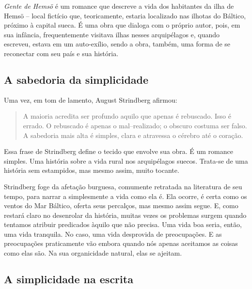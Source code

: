 \documentclass[12pt]{extarticle}
\begin{document}
\emph{Gente de Hemsö} é um romance que descreve a vida dos habitantes da 
ilha de Hemsö -- local fictício que, teoricamente, estaria localizado nas
ilhotas do Báltico, próximo à capital sueca. É uma obra que dialoga com
o próprio autor, pois, em sua infância, frequentemente visitava ilhas
nesses arquipélagos e, quando escreveu, estava em um auto-exílio, sendo
a obra, também, uma forma de se reconectar com seu país e sua história.




\subsection{A sabedoria da simplicidade}

Uma vez, em tom de lamento, August Strindberg afirmou:

\begin{quote}
A maioria acredita ser profundo aquilo que apenas é rebuscado. Isso é
errado. O rebuscado é apenas o mal--realizado; o obscuro costuma ser
falso. A sabedoria mais alta é simples, clara e atravessa o cérebro até
o coração.
\end{quote}

Essa frase de Strindberg define o tecido que envolve sua obra. É um
romance simples. Uma história sobre a vida rural nos arquipélagos
suecos. Trata-se de uma história sem estampidos, mas mesmo assim, muito
tocante.

Strindberg foge da afetação burguesa, comumente retratada na literatura
de seu tempo, para narrar a simplesmente a vida como ela é. Ela ocorre,
é certa como os ventos do Mar Báltico, oferta seus percalços, mas mesmo
assim segue. E, como restará claro no desenrolar da história, muitas
vezes os problemas surgem quando tentamos atribuir predicados àquilo que
não precisa. Uma vida boa seria, então, uma vida tranquila. No caso, uma
vida desprovida de preocupações. E as preocupações praticamente vão
embora quando nós apenas aceitamos as coisas como elas são. Na sua
organicidade natural, elas se ajeitam.




\subsection{A simplicidade na escrita}
\end{document}
